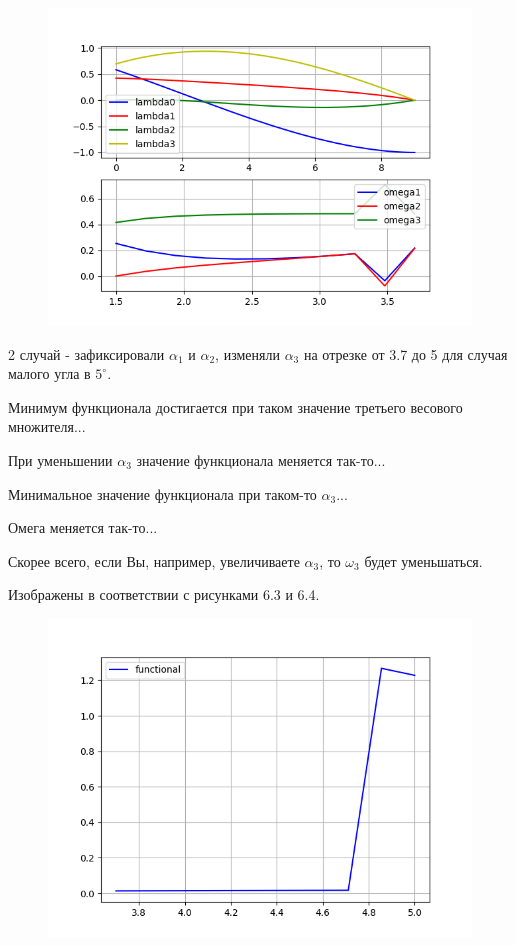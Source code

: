 \documentclass[14pt]{extreport}
\begin{document}
\begin{figure}[H]
\center\includegraphics[scale=0.8]{fig/ivp_and_control_1_5-3_7_50.png}
\caption{}
\end{figure}

2 случай - зафиксировали $\alpha_1$ и $\alpha_2$, изменяли $\alpha_3$ на отрезке от 3.7 до 5 для случая малого угла в $5^{\circ}$.

Минимум функционала достигается при таком значение третьего весового множителя...

При уменьшении $\alpha_3$ значение функционала меняется так-то...

Минимальное значение функционала при таком-то $\alpha_3$...

Омега меняется так-то...

Скорее всего, если Вы, например, увеличиваете $\alpha_3$, то $\omega_3$ будет уменьшаться.

Изображены в соответствии с рисунками 6.3 и 6.4.

\begin{figure}[H]
\center\includegraphics[scale=0.8]{fig/functional_3_7-5_5.png}
\caption{}
\end{figure}
\end{document}
